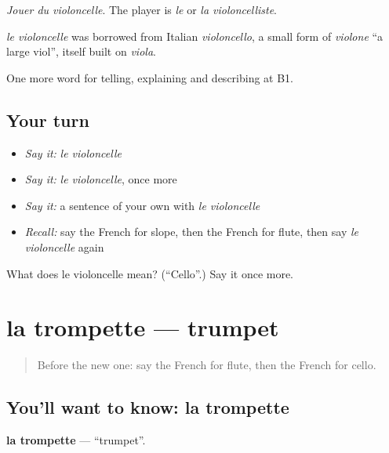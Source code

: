 \emph{Jouer du violoncelle}. The player is \emph{le} or \emph{la violoncelliste}.

\begin{cousinweb}
\emph{le violoncelle} was borrowed from Italian \emph{violoncello}, a small form of \emph{violone} \textquotedblleft{}a large viol\textquotedblright{}, itself built on \emph{viola}.
\end{cousinweb}

\begin{grammarlens}[title={What you've built}]
One more word for telling, explaining and describing at B1.
\end{grammarlens}

\subsection*{Your turn}
\begin{itemize}
\raggedright
  \item \emph{Say it:} \emph{le violoncelle}
  \item \emph{Say it:} \emph{le violoncelle}, once more
  \item \emph{Say it:} a sentence of your own with \emph{le violoncelle}
  \item \emph{Recall:} say the French for slope, then the French for flute, then say \emph{le violoncelle} again
\end{itemize}

\begin{tcolorbox}[breakable,colback=teal!4,colframe=teal!35!black,title={Before you move on}]
What does le violoncelle mean? (\textquotedblleft{}Cello\textquotedblright{}.) Say it once more.
\end{tcolorbox}
\section[la trompette]{la trompette — trumpet}

\label{lesson:FR-C511-trompette}



\begin{quote}
Before the new one: say the French for flute, then the French for cello.
\end{quote}

\subsection*{You'll want to know: la trompette}
\textbf{la trompette} — \textquotedblleft{}trumpet\textquotedblright{}.

